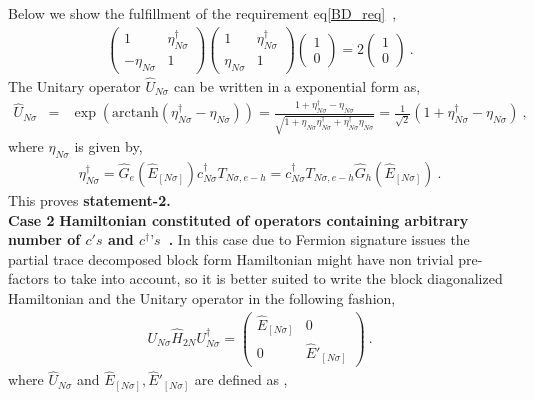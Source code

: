 \documentclass[12pt,a4paper]{article}
\begin{document}
Below we show the fulfillment of the requirement eq\eqref{BD_req}~,
\begin{eqnarray}
\begin{pmatrix}
1 & \eta^{\dagger}_{N\sigma} \\
-\eta_{N\sigma} & 1
\end{pmatrix}\begin{pmatrix}
1 & \eta^{\dagger}_{N\sigma} \\
\eta_{N\sigma} & 1
\end{pmatrix}\begin{pmatrix}
1 \\ 0
\end{pmatrix}=2\begin{pmatrix}
1 \\ 0
\end{pmatrix}~.
\end{eqnarray}
The Unitary operator $\hat{U}_{N\sigma}$ can be written in a exponential form as,
\begin{eqnarray}
\hat{U}_{N\sigma} &=&\exp(\text{arctanh}(\eta^{\dagger}_{N\sigma}-\eta_{N\sigma}))= \frac{1+\eta^{\dagger}_{N\sigma}-\eta_{N\sigma}}{\sqrt{1+\eta_{N\sigma}\eta^{\dagger}_{N\sigma}+\eta^{\dagger}_{N\sigma}\eta_{N\sigma}}}=\frac{1}{\sqrt{2}}(1+\eta^{\dagger}_{N\sigma}-\eta_{N\sigma})~,\nonumber\label{unitary_matrix}
\end{eqnarray}
where $\eta_{N\sigma}$ is given by,
\begin{eqnarray}
\eta^{\dagger}_{N\sigma} = \hat{G}_{e}(\hat{E}_{[N\sigma]})c^{\dagger}_{N\sigma}T_{N\sigma,e-h} = c^{\dagger}_{N\sigma}T_{N\sigma,e-h}\hat{G}_{h}(\hat{E}_{[N\sigma]})~.\nonumber
\end{eqnarray}
This proves \textbf{statement-2.}\\
\textbf{Case 2} \textbf{Hamiltonian constituted of operators containing arbitrary number of $c's$ and $c^{\dagger}\text{'}s$~.}
In this case due to Fermion signature issues the partial trace decomposed block form Hamiltonian might have non trivial pre-factors to take into account, so it is better suited to write the block diagonalized Hamiltonian and the Unitary operator in the following fashion,
\begin{eqnarray}
U_{N\sigma}\hat{H}_{2N}U^{\dagger}_{N\sigma}  =  \begin{pmatrix}
\hat{E}_{[N\sigma]} & 0\\
0 & \hat{E}'_{[N\sigma]}
\end{pmatrix}~.
\end{eqnarray} 
where $\hat{U}_{N\sigma}$ and $\hat{E}_{[N\sigma]},\hat{E}'_{[N\sigma]}$ are defined as ,
\end{document}
